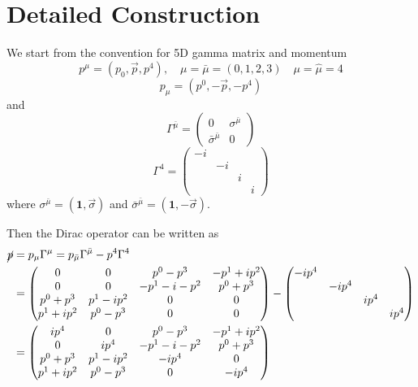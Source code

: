 \documentclass[12pt]{article}
\begin{document}
\section{Detailed Construction}
\noindent
We start from the convention for 5D gamma matrix and momentum
\begin{equation}
    p^\mu=(p_0,\vec{p},p^4), \quad \mu=\bar{\mu}=(0,1,2,3) \quad \mu=\hat{\mu}=4
\end{equation}
\begin{equation}
    p_\mu=(p^0,-\vec{p},-p^4)
\end{equation}
and
\begin{equation}
    \Gamma^{\bar{\mu}}=\begin{pmatrix}
        0 & \sigma^{\bar{\mu}}\\
        \bar{\sigma}^{\bar{\mu}} & 0
    \end{pmatrix}
\end{equation}
\begin{equation}
    \Gamma^4=\begin{pmatrix}
        -i & & &\\
         & -i & &\\
         & & i & \\
         & & & i 

    \end{pmatrix}
\end{equation}
where $\sigma^{\bar{\mu}}=(\mathbf{1},\vec{\sigma})$ and $\bar{\sigma}^{\bar{\mu}}=(\mathbf{1},-\vec{\sigma})$.

Then the Dirac operator can be written as
\begin{align}
    \cancel{p}&=p_\mu\Gamma^\mu=p_{\bar{\mu}}\Gamma^{\bar{\mu}}-p^4 \Gamma^4\notag \\
    &=\begin{pmatrix}
        0 & 0 & p^0-p^3 & -p^1+ip^2 \\
        0 & 0 & -p^1-i-p^2 & p^0+p^3 \\
        p^0+p^3 & p^1-ip^2 & 0 & 0 \\
        p^1+ip^2 & p^0-p^3 & 0 & 0 
    \end{pmatrix} -\begin{pmatrix}
        -ip^4 & & &\\
         & -ip^4 & &\\
         & & ip^4 & \\
         & & & ip^4 
    \end{pmatrix} \notag \\
    &=\begin{pmatrix}
        ip^4 & 0 & p^0-p^3 & -p^1+ip^2 \\
        0 & ip^4 & -p^1-i-p^2 & p^0+p^3 \\
        p^0+p^3 & p^1-ip^2 & -ip^4 & 0 \\
        p^1+ip^2 & p^0-p^3 & 0 & -ip^4 
    \end{pmatrix}
\end{align}
\end{document}
